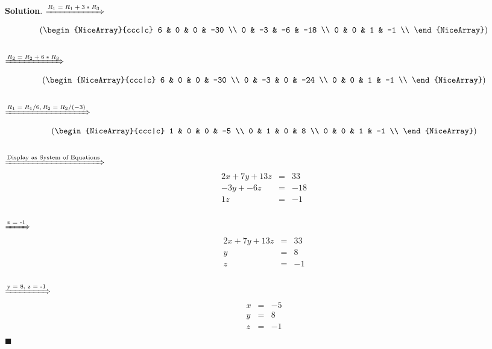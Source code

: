 \documentclass[12pt]{article}
\renewcommand{\=}[1]{\stackrel{#1}{=}} %
\theoremstyle{definition}
\newenvironment{s}{%
        \begin{trivlist} \item \textbf{Solution}. }{%
            \hspace*{\fill} $\blacksquare$\end{trivlist}}%
\begin{document}
\begin{s}
  $\xRightarrow{\text{$R_1 = R_1 + 3 * R_3$}}$
  \\
     
  \[
    \left(\begin{NiceArray}{ccc|c}
      6 & 0  & 0  & -30 \\
      0 & -3 & -6 & -18 \\
      0 & 0  & 1  & -1  \\
    \end{NiceArray} \right)
  \]
  \\

  $\xRightarrow{\text{$R_2 = R_2 + 6 * R_3$}}$
  \\
     
  \[
    \left(\begin{NiceArray}{ccc|c}
      6 & 0  & 0  & -30 \\
      0 & -3 & 0 & -24 \\
      0 & 0  & 1  & -1  \\
    \end{NiceArray} \right)
  \]
  \\
  $\xRightarrow{\text{$R_1 = R_1 / 6, R_2 = R_2 / (-3)$}}$
  \\
     
  \[
    \left(\begin{NiceArray}{ccc|c}
      1 & 0  & 0  & -5 \\
      0 & 1 & 0 & 8 \\
      0 & 0  & 1  & -1  \\
    \end{NiceArray} \right)
  \]
  \\
  $\xRightarrow{\text{Display as System of Equations}}$
  \\
  \[
    \begin{array}{lcl} 
    2x +7y + 13z & = & 33 \\ 
    -3y + -6z & = & -18 \\ 
    1z & = & -1 \\
    \end{array}
  \]
  \\
  $\xRightarrow{\text{z = -1}}$
  \\
  \[
    \begin{array}{lcl} 
    2x +7y + 13z & = & 33 \\ 
    y & = & 8 \\ 
    z & = & -1 \\
    \end{array}
  \]
  \\
  $\xRightarrow{\text{y = 8, z = -1}}$
  \\
  \[
    \begin{array}{lcl} 
    x & = & -5 \\ 
    y & = & 8 \\ 
    z & = & -1 \\
    \end{array}
  \]
\end{s}
\end{document}
